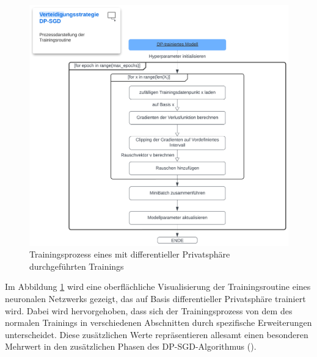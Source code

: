 \begin{figure}
	\centering
	\hspace{-1.5cm}
	\includegraphics[width=0.9\linewidth]{Bilder/dpsgd.png}
	\caption{Trainingsprozess eines mit differentieller Privatsphäre durchgeführten Trainings}
	\label{img:dpsgd}
\end{figure}

Im Abbildung \ref{img:dpsgd} wird eine oberflächliche Visualisierung der Trainingsroutine eines neuronalen Netzwerks gezeigt, das auf Basis differentieller Privatsphäre trainiert wird. Dabei wird hervorgehoben, dass sich der Trainingsprozess von dem des \glqq normalen\grqq{} Trainings in verschiedenen Abschnitten durch spezifische Erweiterungen unterscheidet. Diese zusätzlichen Werte repräsentieren allesamt einen besonderen Mehrwert in den zusätzlichen Phasen des DP-SGD-Algorithmus (\cite[3]{abadi_deep_2016}).

